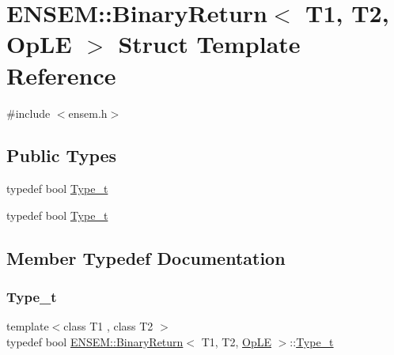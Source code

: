 \hypertarget{structENSEM_1_1BinaryReturn_3_01T1_00_01T2_00_01OpLE_01_4}{}\section{E\+N\+S\+EM\+:\+:Binary\+Return$<$ T1, T2, Op\+LE $>$ Struct Template Reference}
\label{structENSEM_1_1BinaryReturn_3_01T1_00_01T2_00_01OpLE_01_4}


{\ttfamily \#include $<$ensem.\+h$>$}

\subsection*{Public Types}
\begin{DoxyCompactItemize}
\item 
typedef bool \mbox{\hyperlink{structENSEM_1_1BinaryReturn_3_01T1_00_01T2_00_01OpLE_01_4_a052f794f01ea501a773007550e90886d}{Type\+\_\+t}}
\item 
typedef bool \mbox{\hyperlink{structENSEM_1_1BinaryReturn_3_01T1_00_01T2_00_01OpLE_01_4_a052f794f01ea501a773007550e90886d}{Type\+\_\+t}}
\end{DoxyCompactItemize}


\subsection{Member Typedef Documentation}
\mbox{\label{structENSEM_1_1BinaryReturn_3_01T1_00_01T2_00_01OpLE_01_4_a052f794f01ea501a773007550e90886d}} 
\subsubsection{\texorpdfstring{Type\_t}{Type\_t}\hspace{0.1cm}{\footnotesize\ttfamily [1/2]}}
{\footnotesize\ttfamily template$<$class T1 , class T2 $>$ \\
typedef bool \mbox{\hyperlink{structENSEM_1_1BinaryReturn}{E\+N\+S\+E\+M\+::\+Binary\+Return}}$<$ T1, T2, \mbox{\hyperlink{structENSEM_1_1OpLE}{Op\+LE}} $>$\+::\mbox{\hyperlink{structENSEM_1_1BinaryReturn_3_01T1_00_01T2_00_01OpLE_01_4_a052f794f01ea501a773007550e90886d}{Type\+\_\+t}}}

